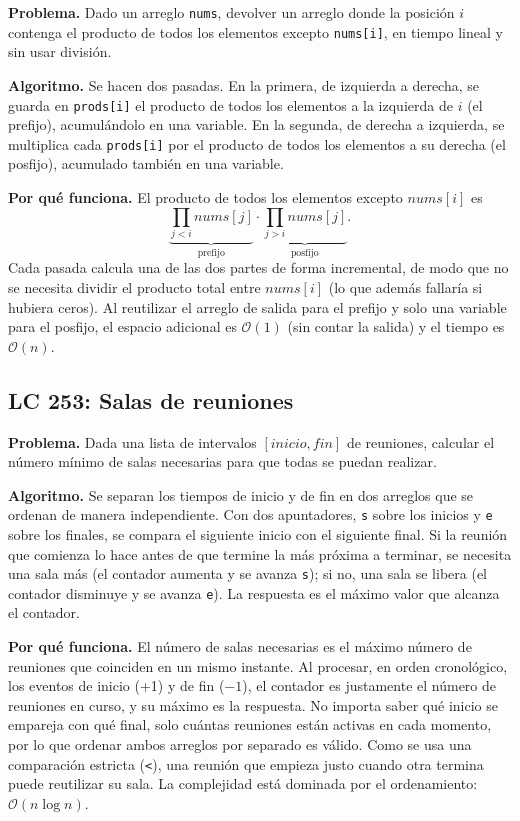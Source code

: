 \documentclass[11pt,letterpaper]{article}
\newcommand{\bigO}[1]{\ensuremath{\mathcal{O}(#1)}}
\begin{document}
\textbf{Problema.} Dado un arreglo \texttt{nums}, devolver un arreglo donde la posición $i$ contenga el producto de todos los elementos excepto \texttt{nums[i]}, en tiempo lineal y sin usar división.

\textbf{Algoritmo.} Se hacen dos pasadas. En la primera, de izquierda a derecha, se guarda en \texttt{prods[i]} el producto de todos los elementos a la izquierda de $i$ (el prefijo), acumulándolo en una variable. En la segunda, de derecha a izquierda, se multiplica cada \texttt{prods[i]} por el producto de todos los elementos a su derecha (el posfijo), acumulado también en una variable.

\textbf{Por qué funciona.} El producto de todos los elementos excepto $nums[i]$ es
\[
\underbrace{\prod_{j<i} nums[j]}_{\text{prefijo}} \cdot \underbrace{\prod_{j>i} nums[j]}_{\text{posfijo}}.
\]
Cada pasada calcula una de las dos partes de forma incremental, de modo que no se necesita dividir el producto total entre $nums[i]$ (lo que además fallaría si hubiera ceros). Al reutilizar el arreglo de salida para el prefijo y solo una variable para el posfijo, el espacio adicional es \bigO{1} (sin contar la salida) y el tiempo es \bigO{n}.

\subsection{LC 253: Salas de reuniones}

\textbf{Problema.} Dada una lista de intervalos $[inicio, fin]$ de reuniones, calcular el número mínimo de salas necesarias para que todas se puedan realizar.

\textbf{Algoritmo.} Se separan los tiempos de inicio y de fin en dos arreglos que se ordenan de manera independiente. Con dos apuntadores, \texttt{s} sobre los inicios y \texttt{e} sobre los finales, se compara el siguiente inicio con el siguiente final. Si la reunión que comienza lo hace antes de que termine la más próxima a terminar, se necesita una sala más (el contador aumenta y se avanza \texttt{s}); si no, una sala se libera (el contador disminuye y se avanza \texttt{e}). La respuesta es el máximo valor que alcanza el contador.

\textbf{Por qué funciona.} El número de salas necesarias es el máximo número de reuniones que coinciden en un mismo instante. Al procesar, en orden cronológico, los eventos de inicio (+1) y de fin ($-1$), el contador es justamente el número de reuniones en curso, y su máximo es la respuesta. No importa saber qué inicio se empareja con qué final, solo cuántas reuniones están activas en cada momento, por lo que ordenar ambos arreglos por separado es válido. Como se usa una comparación estricta (\texttt{<}), una reunión que empieza justo cuando otra termina puede reutilizar su sala. La complejidad está dominada por el ordenamiento: \bigO{n \log n}.
\end{document}
